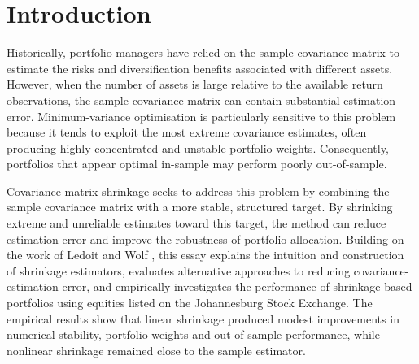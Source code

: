 \section{Introduction}

Historically, portfolio managers have relied on the sample covariance matrix to estimate the risks and diversification benefits associated with different assets. However, when the number of assets is large relative to the available return observations, the sample covariance matrix can contain substantial estimation error. Minimum-variance optimisation is particularly sensitive to this problem because it tends to exploit the most extreme covariance estimates, often producing highly concentrated and unstable portfolio weights. Consequently, portfolios that appear optimal in-sample may perform poorly out-of-sample.

Covariance-matrix shrinkage seeks to address this problem by combining the sample covariance matrix with a more stable, structured target. By shrinking extreme and unreliable estimates toward this target, the method can reduce estimation error and improve the robustness of portfolio allocation. Building on the work of Ledoit and Wolf \parencite{LEDOIT2003603,ledoit2004well}, this essay explains the intuition and construction of shrinkage estimators, evaluates alternative approaches to reducing covariance-estimation error, and empirically investigates the performance of shrinkage-based portfolios using equities listed on the Johannesburg Stock Exchange. The empirical results show that linear shrinkage produced modest improvements in numerical stability, portfolio weights and out-of-sample performance, while nonlinear shrinkage remained close to the sample estimator.
